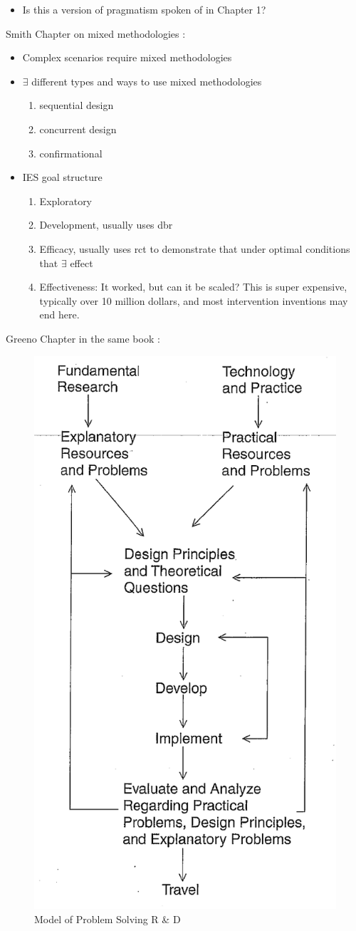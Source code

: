 \documentclass{TC}
\begin{document}
	\begin{itemize}[(??)]
	\item Is this a version of pragmatism spoken of in Chapter 1?
	\end{itemize}

Smith Chapter on mixed methodologies \parencite{green_multiple_2006}: 
\begin{itemize}
\item Complex scenarios require mixed methodologies
\item $\exists$ different types and ways to use mixed methodologies
	\begin{enumerate}
	\item sequential design
	\item concurrent design
	\item confirmational
	\end{enumerate}
	
\item \gls{IES} goal structure
	\begin{enumerate}
	\item Exploratory
	\item Development, usually uses \gls{dbr}
	\item Efficacy, usually uses \gls{rct} to demonstrate that under optimal conditions that $\exists$ effect
	\item Effectiveness: It worked, but can it be scaled? This is super expensive, typically over 10 million dollars, and most intervention inventions may end here.
	\end{enumerate}
\end{itemize}
Greeno Chapter in the same book \parencite{green_theoretical_2006}:

\begin{figure}[h]
\centering
\includegraphics[width=.4\textwidth]{greeno_model_problem_solving_RandD.png}
\caption{Model of Problem Solving R \& D \parencite{greeno_theoretical_2006}}
\label{fig:Model_of Problem_Solving_R_and_D}
\end{figure}
\end{document}

